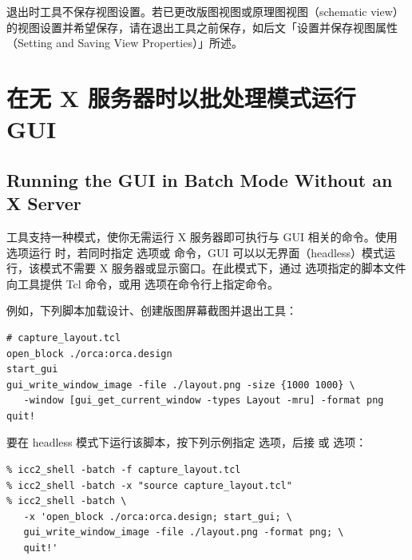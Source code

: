 \begin{noteBox}
退出时工具不保存视图设置。若已更改版图视图或原理图视图（schematic view）的视图设置并希望保存，请在退出工具之前保存，如后文「设置并保存视图属性（Setting and Saving View Properties）」所述。
\end{noteBox}

\section{在无 X 服务器时以批处理模式运行 GUI}
\subsection*{Running the GUI in Batch Mode Without an X Server}

工具支持一种模式，使你无需运行 X 服务器即可执行与 GUI 相关的命令。使用  选项运行  时，若同时指定  选项或  命令，GUI 可以以无界面（headless）模式运行，该模式不需要 X 服务器或显示窗口。在此模式下，通过  选项指定的脚本文件向工具提供 Tcl 命令，或用  选项在命令行上指定命令。

例如，下列脚本加载设计、创建版图屏幕截图并退出工具：
\begin{lstlisting}
# capture_layout.tcl
open_block ./orca:orca.design
start_gui
gui_write_window_image -file ./layout.png -size {1000 1000} \
   -window [gui_get_current_window -types Layout -mru] -format png
quit!
\end{lstlisting}

要在 headless 模式下运行该脚本，按下列示例指定  选项，后接  或  选项：
\begin{lstlisting}
% icc2_shell -batch -f capture_layout.tcl
% icc2_shell -batch -x "source capture_layout.tcl"
% icc2_shell -batch \
   -x 'open_block ./orca:orca.design; start_gui; \
   gui_write_window_image -file ./layout.png -format png; \
   quit!'
\end{lstlisting}

